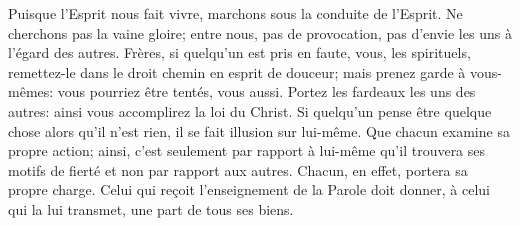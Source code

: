 Puisque l’Esprit nous fait vivre, marchons sous la conduite de l’Esprit.
Ne cherchons pas la vaine gloire;
	entre nous, pas de provocation, pas d’envie les uns à l’égard des autres.
Frères, si quelqu’un est pris en faute,
	vous, les spirituels, remettez-le dans le droit chemin en esprit de douceur;
	mais prenez garde à vous-mêmes: vous pourriez être tentés, vous aussi.
Portez les fardeaux les uns des autres:
	ainsi vous accomplirez la loi du Christ.
Si quelqu’un pense être quelque chose alors qu’il n’est rien,
	il se fait illusion sur lui-même.
Que chacun examine sa propre action;
	ainsi, c’est seulement par rapport à lui-même qu’il trouvera ses motifs de fierté
	et non par rapport aux autres.
	Chacun, en effet, portera sa propre charge.
Celui qui reçoit l’enseignement de la Parole
	doit donner, à celui qui la lui transmet, une part de tous ses biens.
